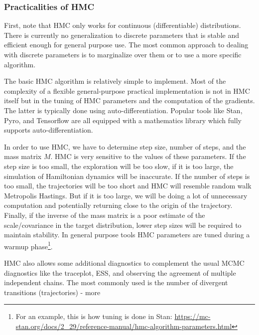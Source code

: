 \documentclass{book}
\theoremstyle{plain}%
\theoremstyle{definition}
\begin{document}
\subsubsection*{Practicalities of HMC}

First, note that HMC only works for continuous (differentiable) distributions. There is currently no generalization to discrete parameters that is stable and efficient enough for general purpose use. The most common approach to dealing with discrete parameters is to marginalize over them or to use a more specific algorithm.

The basic HMC algorithm is relatively simple to implement. Most of the complexity of a flexible general-purpose practical implementation is not in HMC itself but in the tuning of HMC parameters and the computation of the gradients. The latter is typically done using auto-differentiation. Popular tools like Stan, Pyro, and Tensorflow are all equipped with a mathematics library which fully supports auto-differentiation.

In order to use HMC, we have to determine step size, number of steps, and the mass matrix $M$. HMC is very sensitive to the values of these parameters. If the step size is too small, the exploration will be too slow, if it is too large, the simulation of Hamiltonian dynamics will be inaccurate. If the number of steps is too small, the trajectories will be too short and HMC will resemble random walk Metropolis Hastings. But if it is too large, we will be doing a lot of unnecessary computation and potentially returning close to the origin of the trajectory. Finally, if the inverse of the mass matrix is a poor estimate of the scale/covariance in the target distribution, lower step sizes will be required to maintain stability. In general purpose tools HMC parameters are tuned during a warmup phase\footnote{For an example, this is how tuning is done in Stan: \url{https://mc-stan.org/docs/2_29/reference-manual/hmc-algorithm-parameters.html}}.

HMC also allows some additional diagnostics to complement the usual MCMC diagnostics like the traceplot, ESS, and observing the agreement of multiple independent chains. The most commonly used is the number of divergent transitions (trajectories) - more
\end{document}
